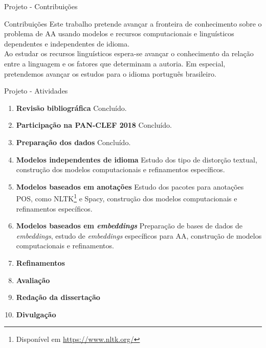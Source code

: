 \begin{frame}{Projeto - Contribuições}
	\begin{block}{Contribuições}
		Este trabalho pretende avançar a fronteira de conhecimento sobre o problema de AA usando modelos e recursos computacionais e linguísticos dependentes e independentes de idioma.\\Ao estudar os recursos linguísticos espera-se avançar o conhecimento da relação entre a linguagem e os fatores que determinam a autoria. Em especial, pretendemos avançar os estudos para o idioma português brasileiro. 
	\end{block}
\end{frame}


\begin{frame}{Projeto - Atividades}

\begin{enumerate}
	\item {\bf Revisão bibliográfica} Concluído.
	
	\item {\bf Participação na PAN-CLEF 2018} Concluído.
	
	\item {\bf Preparação dos dados} Concluído.
	
	\item {\bf Modelos independentes de idioma} Estudo dos tipo de distorção textual, construção dos modelos computacionais e refinamentos específicos.
	
	\item {\bf Modelos baseados em anotações} Estudo dos pacotes para anotações POS, como NLTK\footnote{Disponível em  \url{https://www.nltk.org/}} e Spacy, construção dos modelos computacionais e refinamentos específicos.
	
	\item {\bf Modelos baseados em {\it embeddings}} Preparação de bases de dados de {\it embeddings}, estudo de {\it embeddings} específicos para AA, construção de modelos computacionais e refinamentos.
	
	\item {\bf Refinamentos} 
	
	\item {\bf Avaliação}
	
	\item {\bf Redação da dissertação} 
	
	\item {\bf Divulgação} 
\end{enumerate}
\end{frame}

